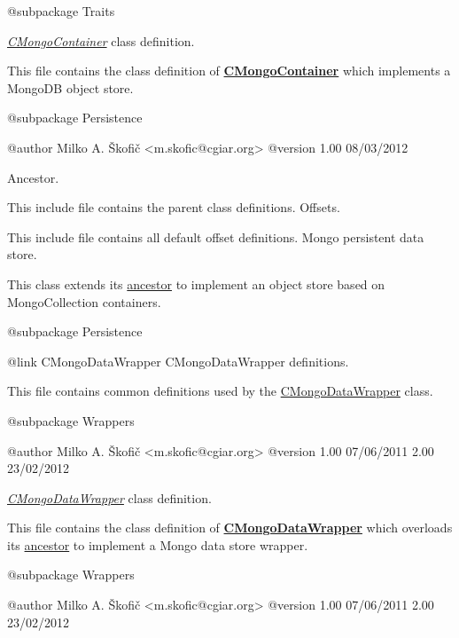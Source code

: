 \begin{DoxyVerb} @subpackage        Traits\end{DoxyVerb}


{\itshape \hyperlink{class_c_mongo_container}{C\-Mongo\-Container}} class definition.

This file contains the class definition of {\bfseries \hyperlink{class_c_mongo_container}{C\-Mongo\-Container}} which implements a Mongo\-D\-B object store.

\begin{DoxyVerb} @subpackage        Persistence

 @author            Milko A. Škofič <m.skofic@cgiar.org>
 @version   1.00 08/03/2012\end{DoxyVerb}


Ancestor.

This include file contains the parent class definitions. Offsets.

This include file contains all default offset definitions. Mongo persistent data store.

This class extends its \hyperlink{class_c_container}{ancestor} to implement an object store based on Mongo\-Collection containers.

\begin{DoxyVerb} @subpackage        Persistence\end{DoxyVerb}


\begin{DoxyVerb} {@link CMongoDataWrapper CMongoDataWrapper} definitions.
\end{DoxyVerb}


This file contains common definitions used by the \hyperlink{class_c_mongo_data_wrapper}{C\-Mongo\-Data\-Wrapper} class.

\begin{DoxyVerb} @subpackage        Wrappers

 @author            Milko A. Škofič <m.skofic@cgiar.org>
 @version   1.00 07/06/2011
                    2.00 23/02/2012\end{DoxyVerb}


{\itshape \hyperlink{class_c_mongo_data_wrapper}{C\-Mongo\-Data\-Wrapper}} class definition.

This file contains the class definition of {\bfseries \hyperlink{class_c_mongo_data_wrapper}{C\-Mongo\-Data\-Wrapper}} which overloads its \hyperlink{class_c_data_wrapper}{ancestor} to implement a Mongo data store wrapper.

\begin{DoxyVerb} @subpackage        Wrappers

 @author            Milko A. Škofič <m.skofic@cgiar.org>
 @version   1.00 07/06/2011
                    2.00 23/02/2012\end{DoxyVerb}


